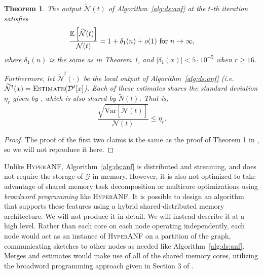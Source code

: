 \documentclass[10]{report}
\newtheorem{theorem}{Theorem}[section]
\newcommand{\algoname}[1]{\textnormal{\textsc{#1}}}
\newcommand{\E}{\mathbb{E}}
\newcommand{\Var}{\mathrm{Var}}
\begin{document}
\begin{theorem}
The output $\widetilde{\mathcal{N}}(t)$ of Algorithm~\ref{alg:ds:anf} at the $t$-th iteration satisfies 
%
\begin{equation*}
	\frac{\E \left [ \widetilde{\mathcal{N}}(t) \right ]}{\mathcal{N}(t)} = 1 + \delta_1(n) + o(1) \textnormal{ for $n \rightarrow \infty$,}
\end{equation*}
%
where $\delta_1(n)$ is the same as in \cite{flajolet2007hyperloglog} Theorem 1, and $|\delta_1(x)| < 5 \cdot 10^{-5}$ when $r \geq 16$.

Furthermore, let $\widetilde{\mathcal{N}}^t(\cdot)$ be the local output of Algorithm~\ref{alg:ds:anf} (i.e. $\widetilde{\mathcal{N}}^t(x) = \algoname{Estimate}(\mathcal{D}^t[x]$).
Each of these estimates shares the standard deviation $\eta_r$ given by \cite{flajolet2007hyperloglog}, which is also shared by $\widetilde{N}(t)$. 
That is, 
%
\begin{equation*}
	\frac{\sqrt{\Var \left [ \widetilde{\mathcal{N}}(t)\right ]}}{\mathcal{N}(t)} \leq \eta_r.
\end{equation*}
%
\end{theorem}

\begin{proof}
The proof of the first two claims is the same as the proof of Theorem 1 in \cite{boldi2011hyperanf}, so we will not reproduce it here.
\end{proof}



Unlike \algoname{HyperANF}, Algorithm~\ref{alg:ds:anf} is distributed and streaming, and does not require the storage of $\mathcal{G}$ in memory. 
However, it is also not optimized to take advantage of shared memory task decomposition or multicore optimizations using \emph{broadword programming} like \algoname{HyperANF}.
It is possible to design an algorithm that supports these features using a hybrid shared-distributed memory architecture. 
We will not produce it in detail.
We will instead describe it at a high level.
Rather than each core on each node operating independently, each node would act as an instance of \algoname{HyperANF} on a partition of the graph, communicating sketches to other nodes as needed like Algorithm~\ref{alg:ds:anf}.
Merges and estimates would make use of all of the shared memory cores, utilizing the broadword programming approach given in Section 3 of \cite{boldi2011hyperanf}.
\end{document}
